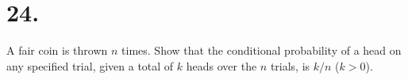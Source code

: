 \section*{24.}
A fair coin is thrown $n$ times. Show that the conditional probability of a head
on any specified trial, given a total of $k$ heads over the $n$ trials,
is $k/n$ ($k>0$).


